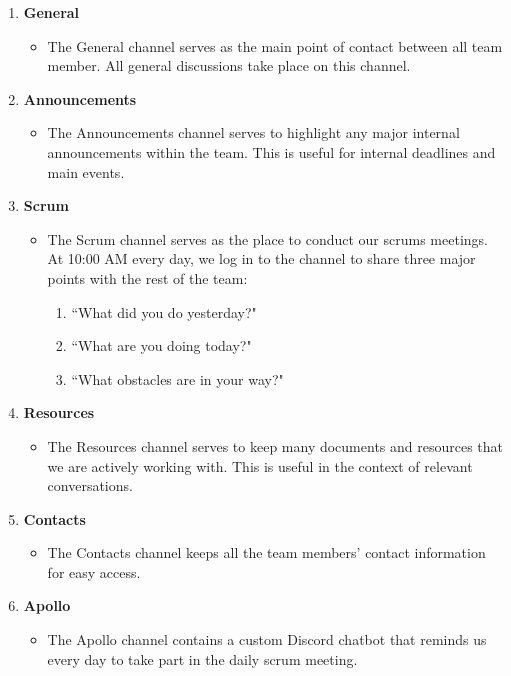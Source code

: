 \documentclass[titlepage, 12pt]{article}
\begin{document}
\begin{enumerate}
    \item \textbf{General}
    \begin{itemize}
        \item The General channel serves as the main point of contact between all team member. All general discussions take place on this channel.
    \end{itemize}
    \item \textbf{Announcements}
        \begin{itemize}
        \item The Announcements channel serves to highlight any major internal announcements within the team. This is useful for internal deadlines and main events.
    \end{itemize}
    \item \textbf{Scrum}
        \begin{itemize}
        \item The Scrum channel serves as the place to conduct our scrums meetings. At 10:00 AM every day, we log in to the channel to share three major points with the rest of the team:
        \begin{enumerate}
            \item ``What did you do yesterday?"
            \item ``What are you doing today?"
            \item ``What obstacles are in your way?"
        \end{enumerate}
    \end{itemize}
    \item \textbf{Resources}
        \begin{itemize}
        \item The Resources channel serves to keep many documents and resources that we are actively working with. This is useful in the context of relevant conversations.
    \end{itemize}
    \item \textbf{Contacts}
        \begin{itemize}
        \item The Contacts channel keeps all the team members' contact information for easy access.
    \end{itemize}
    \item \textbf{Apollo}
        \begin{itemize}
        \item The Apollo channel contains a custom Discord chatbot that reminds us every day to take part in the daily scrum meeting.
    \end{itemize}
\end{enumerate}
\end{document}
